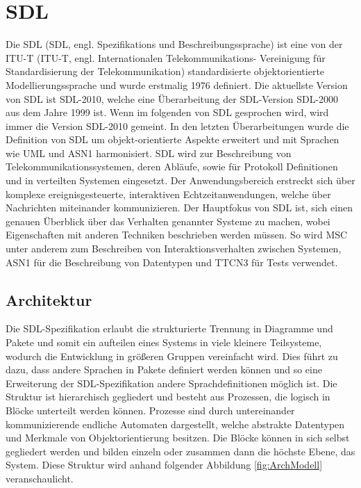 \section{\acf{SDL}}
\label{sc:SDL}
Die \ac{SDL} (\ac{SDL}, engl. Spezifikations und Beschreibungssprache) ist eine von der \ac{ITU-T} (\ac{ITU-T}, engl. Internationalen 
Telekommunikations- Vereinigung für Standardisierung der Telekommunikation) standardisierte objektorientierte Modellierungssprache und wurde erstmalig 
1976 definiert. Die aktuellste Version von \ac{SDL} ist \ac{SDL}-2010, welche eine Überarbeitung der \ac{SDL}-Version \ac{SDL}-2000 aus dem Jahre 
1999 ist. Wenn im folgenden von \ac{SDL} gesprochen wird, wird immer die Version \acs{SDL}-2010 gemeint. 
In den letzten Überarbeitungen wurde die Definition von \ac{SDL} um objekt-orientierte Aspekte erweitert und mit Sprachen wie \ac{UML} und \ac{ASN1} harmonisiert.
\ac{SDL} wird zur Beschreibung von Telekommunikationssystemen, deren Abläufe, sowie für Protokoll Definitionen und in verteilten Systemen eingesetzt.
Der Anwendungsbereich erstreckt sich über komplexe ereignisgesteuerte, interaktiven Echtzeitanwendungen, welche über Nachrichten miteinander kommunizieren. 
Der Hauptfokus von \ac{SDL} ist, sich einen genauen Überblick über das Verhalten genannter Systeme zu machen, wobei Eigenschaften mit anderen Techniken beschrieben werden müssen. 
So wird \ac{MSC} unter anderem zum Beschreiben von Interaktionsverhalten zwischen Systemen, \ac{ASN1} für die Beschreibung von Datentypen und \ac{TTCN3} für Tests verwendet.


\subsection{Architektur}
\label{ssc:Architektur}
Die \ac{SDL}-Spezifikation erlaubt die strukturierte Trennung in Diagramme und Pakete und somit ein aufteilen eines Systems in viele kleinere Teilsysteme,
wodurch die Entwicklung in größeren Gruppen vereinfacht wird.
Dies führt zu dazu, dass andere Sprachen in Pakete definiert werden können und so eine Erweiterung der \ac{SDL}-Spezifikation andere Sprachdefinitionen möglich ist.
Die Struktur ist hierarchisch gegliedert und besteht aus Prozessen, die logisch in Blöcke unterteilt werden können.
Prozesse sind durch untereinander kommunizierende endliche Automaten dargestellt, welche abstrakte Datentypen und Merkmale von Objektorientierung besitzen.
Die Blöcke können in sich selbst gegliedert werden und bilden einzeln oder zusammen dann die höchste Ebene, das System. Diese Struktur wird anhand folgender Abbildung \ref{fig:ArchModell} veranschaulicht.
 
